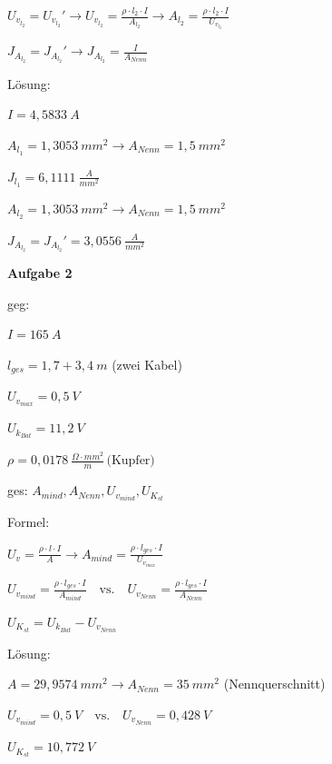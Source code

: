 $U_{v_{l_2}} = U_{v_{l_2}}' \to U_{v_{l_2}} = \frac{\rho \cdot l_2 \cdot I}{A_{l_2}} \to A_{l_2} = \frac{\rho \cdot l_2 \cdot I}{U_{v_{l_2}}}$

$J_{A_{l_2}} = J_{A_{l_2}}' \to J_{A_{l_2}} = \frac{I}{A_{Nenn}}$

Lösung:

$I = 4,5833~A$

$A_{l_1} = 1,3053~mm^2 \to A_{Nenn} = 1,5~mm^2$

$J_{l_1} = 6,1111~\frac{A}{mm^2}$

$A_{l_2} = 1,3053~mm^2 \to A_{Nenn} = 1,5~mm^2$

$J_{A_{l_2}} = J_{A_{l_2}}' = 3,0556~\frac{A}{mm^2}$

\textbf{Aufgabe 2}

geg:

$I = 165~A$

$l_{ges} = 1,7 + 3,4~m$ (zwei Kabel)

$U_{v_{max}} = 0,5~V$

$U_{k_{Bat}} = 11,2~V$

$\rho = 0,0178~\frac{\Omega \cdot mm^2}{m} \,\text{(Kupfer)}$

ges: $A_{mind}, A_{Nenn}, U_{v_{mind}}, U_{K_{st}}$

Formel:

$U_v = \frac{\rho \cdot l \cdot I}{A} \to A_{mind} = \frac{\rho \cdot l_{ges} \cdot I}{U_{v_{max}}}$

$U_{v_{mind}} = \frac{\rho \cdot l_{ges} \cdot I}{A_{mind}} \quad \text{vs.} \quad U_{v_{Nenn}} = \frac{\rho \cdot l_{ges} \cdot I}{A_{Nenn}}$

$U_{K_{st}} = U_{k_{Bat}} - U_{v_{Nenn}}$

Lösung:

$A = 29,9574~mm^2 \to A_{Nenn} = 35~mm^2$ (Nennquerschnitt)

$U_{v_{mind}} = 0,5~V \quad \text{vs.} \quad U_{v_{Nenn}} = 0,428~V$

$U_{K_{st}} = 10,772~V$
